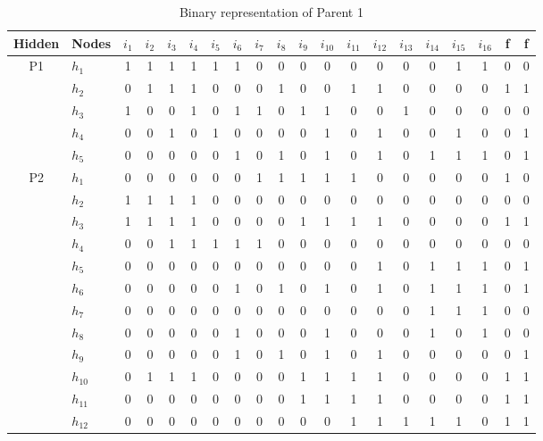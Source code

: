 \begin{table}[h!]
		\centering
		\caption{Binary representation of Parent 1}
		\label{tab:parents1}
		\begin{adjustbox}{width=0.9\textwidth}
		\begin{tabular}{cl|cccc cccc cccc cccc | cc}
			\toprule
			Hidden & Nodes  & $i_1$ & $i_2$ & $i_3$ & $i_4$ & $i_5$ & $i_6$ & $i_7$ & $i_8$ & $i_9$ & $i_{10}$ & $i_{11}$ & $i_{12}$ & $i_{13}$ & $i_{14}$ & $i								_{15}$ & $i_{16}$ & f & f\\
			\midrule
			\multirow{5}{*}{P1}		&	$h_1$ & 1  & 1 & 1  & 1  & 1 & 1 & 0 & 0  & 0 & 0 & 0 & 0  & 0 & 0  & 1 & 1 & 0 & 0\\
				&	$h_2$ & 0  & 1 & 1  & 1  & 0 & 0 & 0 & 1  & 0 & 0 & 1 & 1  & 0 & 0  & 0 & 0 & 1 & 1\\
				&	$h_3$ & 1  & 0 & 0  & 1  & 0 & 1 & 1 & 0  & 1 & 1 & 0 & 0  & 1 & 0  & 0 & 0 & 0 & 0\\
				&	$h_4$ & 0  & 0 & 1  & 0  & 1 & 0 & 0 & 0  & 0 & 1 & 0 & 1  & 0 & 0  & 1 & 0 & 0 & 1\\
				&	$h_5$ & 0  & 0 & 0  & 0  & 0 & 1 & 0 & 1  & 0 & 1 & 0 & 1  & 0 & 1  & 1 & 1 & 0 & 1\\
			\midrule
			\multirow{12}{*}{P2}	&	$h_1$ & 0  & 0 & 0  & 0  & 0 & 0 & 1 & 1  & 1 & 1	 & 1 & 0  & 0 & 0  & 0 & 0 & 1 & 0\\
				&	$h_2$ & 1  & 1 & 1  & 1  & 0 & 0 & 0 & 0  & 0 & 0	 & 0 & 0  & 0 & 0  & 0 & 0 & 0 & 0\\
				&	$h_3$ & 1  & 1 & 1  & 1  & 0 & 0 & 0 & 0  & 1 & 1	 & 1 & 1  & 0 & 0  & 0 & 0 & 1 & 1\\
				&	$h_4$ & 0  & 0 & 1  & 1  & 1 & 1 & 1 & 0  & 0 & 0	 & 0 & 0  & 0 & 0  & 0 & 0 & 0 & 0\\
				&	$h_5$ & 0  & 0 & 0  & 0  & 0 & 0 & 0 & 0  & 0 & 0	 & 0 & 1  & 0 & 1  & 1 & 1 & 0 & 1\\
				&	$h_6$ & 0  & 0 & 0  & 0  & 0 & 1 & 0 & 1  & 0 & 1	 & 0 & 1  & 0 & 1  & 1 & 1 & 0 & 1\\
				&	$h_7$ & 0  & 0 & 0  & 0  & 0 & 0 & 0 & 0  & 0 & 0	 & 0 & 0  & 0 & 1  & 1 & 1 & 0 & 0\\
				&	$h_8$ & 0  & 0 & 0  & 0  & 0 & 1 & 0 & 0  & 0 & 1	 & 0 & 0  & 0 & 1  & 0 & 1 & 0 & 0\\
				&	$h_9$ & 0  & 0 & 0  & 0  & 0 & 1 & 0 & 1  & 0 & 1	 & 0 & 1  & 0 & 0  & 0 & 0 & 0 & 1\\
				&	$h_{10}$   & 0  & 1 & 1  & 1  & 0 & 0 & 0 & 0  & 1 & 1 & 1 & 1  & 0 & 0  & 0 & 0 & 1 & 1\\
				&	$h_{11}$   & 0  & 0 & 0  & 0  & 0 & 0 & 0 & 0  & 1 & 1 & 1 & 1  & 0 & 0  & 0 & 0 & 1 & 1\\
				&	$h_{12}$   & 0  & 0 & 0  & 0  & 0 & 0 & 0 & 0  & 0 & 0 & 1 & 1  & 1 & 1  & 1 & 0 & 1 & 1\\
			\bottomrule
			\end{tabular}
		\end{adjustbox}
\end{table}


